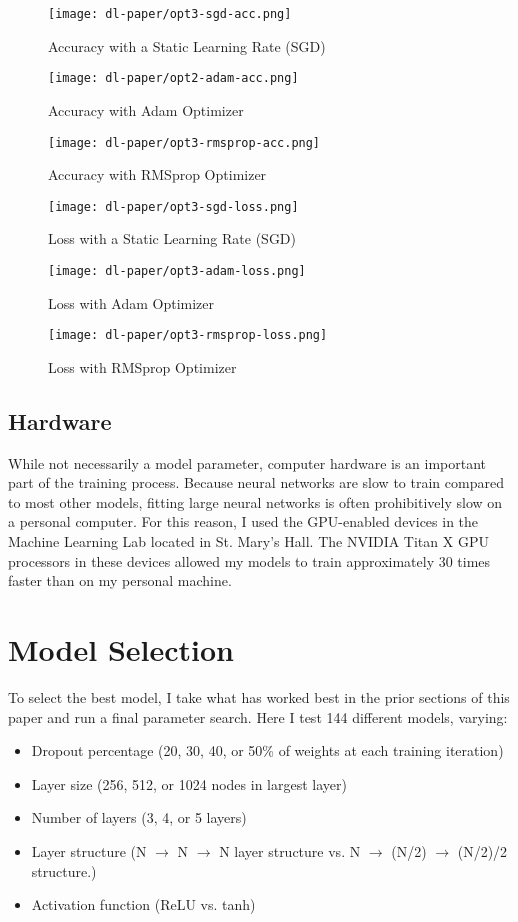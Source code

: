 \documentclass[12pt]{article}  %
\theoremstyle{definition}
\theoremstyle{remark}
\begin{document}
\begin{figure}[!h]
  \texttt{[image: dl-paper/opt3-sgd-acc.png]}
  \caption{Accuracy with a Static Learning Rate (SGD)}\label{sgd-acc}
\endminipage\hfill
{}
  \texttt{[image: dl-paper/opt2-adam-acc.png]}
  \caption{Accuracy with Adam Optimizer}\label{adam-acc}
\endminipage\hfill
{}
  \texttt{[image: dl-paper/opt3-rmsprop-acc.png]}
  \caption{Accuracy with RMSprop Optimizer}\label{rmsprop-acc}
\endminipage
\end{figure}


\begin{figure}[!h]
  \texttt{[image: dl-paper/opt3-sgd-loss.png]}
  \caption{Loss with a Static Learning Rate (SGD)}\label{sgd-loss}
\endminipage\hfill
{}
  \texttt{[image: dl-paper/opt3-adam-loss.png]}
  \caption{Loss with Adam Optimizer}\label{adam-loss}
\endminipage\hfill
{}
  \texttt{[image: dl-paper/opt3-rmsprop-loss.png]}
  \caption{Loss with RMSprop Optimizer}\label{rmsprop-loss}
\endminipage
\end{figure}

\subsection{Hardware}
\par While not necessarily a model parameter, computer hardware is an important part of the training process. Because neural networks are slow to train compared to most other models, fitting large neural networks is often prohibitively slow on a personal computer. For this reason, I used the GPU-enabled devices in the Machine Learning Lab located in St. Mary's Hall. The NVIDIA Titan X GPU processors in these devices allowed my models to train approximately 30 times faster than on my personal machine. 

\section{Model Selection}
\par To select the best model, I take what has worked best in the prior sections of this paper and run a final parameter search. Here I test 144 different models, varying:

\begin{itemize}
\item Dropout percentage (20, 30, 40, or 50\% of weights at each training iteration)
\item Layer size (256, 512, or 1024 nodes in largest layer)
\item Number of layers (3, 4, or 5 layers)
\item Layer structure (N $\rightarrow$ N $\rightarrow$ N layer structure vs. N $\rightarrow$ (N/2) $\rightarrow$ (N/2)/2 structure.)
\item Activation function (ReLU vs. tanh)
\end{itemize}
\end{document}
